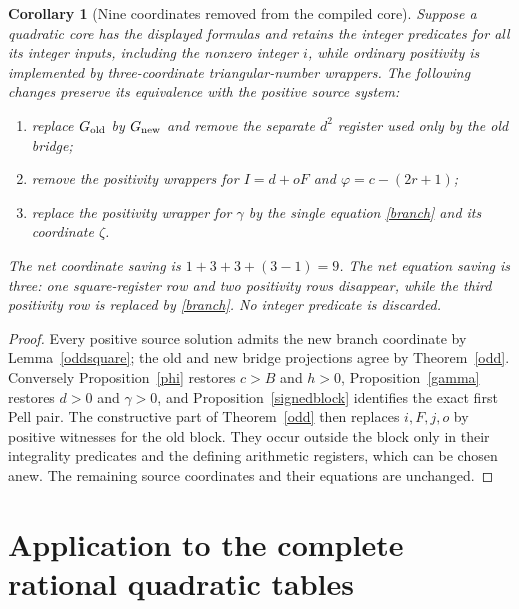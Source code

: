 \documentclass[11pt]{article}
\newtheorem{corollary}[theorem]{Corollary}
\begin{document}
\begin{corollary}[Nine coordinates removed from the compiled core]
Suppose a quadratic core has the displayed formulas and retains the
integer predicates for all its integer inputs, including the
nonzero integer \(i\), while ordinary positivity is implemented by
three-coordinate triangular-number wrappers.  The following changes
preserve its equivalence with the positive source system:
\begin{enumerate}
\item replace \(G_{\rm old}\) by \(G_{\rm new}\) and remove the
separate \(d^2\) register used only by the old bridge;
\item remove the positivity wrappers for \(I=d+oF\) and
\(\varphi=c-(2r+1)\);
\item replace the positivity wrapper for \(\gamma\) by
the single equation \eqref{branch} and its coordinate \(\zeta\).
\end{enumerate}
The net coordinate saving is \(1+3+3+(3-1)=9\).
The net equation saving is three: one square-register row and
two positivity rows disappear, while the third positivity row is
replaced by \eqref{branch}.  No integer predicate is discarded.
\end{corollary}
\begin{proof}
Every positive source solution admits the new branch coordinate by
Lemma~\ref{oddsquare}; the old and new bridge projections agree by
Theorem~\ref{odd}.  Conversely Proposition~\ref{phi} restores
\(c>B\) and \(h>0\), Proposition~\ref{gamma} restores \(d>0\)
and \(\gamma>0\), and Proposition~\ref{signedblock} identifies
the exact first Pell pair.  The constructive part of
Theorem~\ref{odd} then replaces \(i,F,j,o\) by positive
witnesses for the old block.  They occur outside the block only
in their integrality predicates and the defining arithmetic
registers, which can be chosen anew.  The remaining source
coordinates and their equations are unchanged.
\end{proof}

\section{Application to the complete rational quadratic tables}
\end{document}
